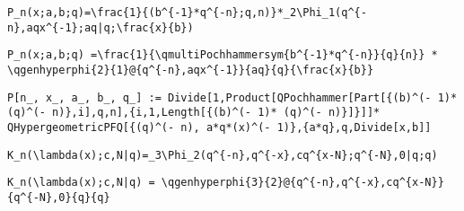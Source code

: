 \newsavebox\DEMA
\begin{lrbox}{\DEMA}
 \begin{minipage}[t]{0.82\textwidth}
  \lstinline[language={[latex]TeX},mathescape,breaklines=true]""
 \end{minipage}
\end{lrbox}
\newsavebox\DFT
\begin{lrbox}{\DFT}
 \begin{minipage}[t]{0.82\textwidth}
  \lstinline[language={[latex]TeX},mathescape,breaklines=true]"P_n(x;a,b;q)=\frac{1}{(b^{-1}*q^{-n};q,n)}*_2\Phi_1(q^{-n},aqx^{-1};aq|q;\frac{x}{b})"
 \end{minipage}
\end{lrbox}
\newsavebox\DFST
\begin{lrbox}{\DFST}
 \begin{minipage}[t]{0.82\textwidth}
  \lstinline[language={[latex]TeX},mathescape,breaklines=true]"P_n(x;a,b;q) =\frac{1}{\qmultiPochhammersym{b^{-1}*q^{-n}}{q}{n}} * \qgenhyperphi{2}{1}@{q^{-n},aqx^{-1}}{aq}{q}{\frac{x}{b}}"
 \end{minipage}
\end{lrbox}
\newsavebox\DFMM
\begin{lrbox}{\DFMM}
 \begin{minipage}[t]{0.82\textwidth}
  \lstinline[language={[latex]TeX},mathescape,breaklines=true]"P[n_, x_, a_, b_, q_] := Divide[1,Product[QPochhammer[Part[{(b)^(- 1)* (q)^(- n)},i],q,n],{i,1,Length[{(b)^(- 1)* (q)^(- n)}]}]]* QHypergeometricPFQ[{(q)^(- n), a*q*(x)^(- 1)},{a*q},q,Divide[x,b]]"
 \end{minipage}
\end{lrbox}
\newsavebox\DFMA
\begin{lrbox}{\DFMA}
 \begin{minipage}[t]{0.82\textwidth}
  \lstinline[language={[latex]TeX},mathescape,breaklines=true]""
 \end{minipage}
\end{lrbox}
\newsavebox\DGT
\begin{lrbox}{\DGT}
 \begin{minipage}[t]{0.82\textwidth}
  \lstinline[language={[latex]TeX},mathescape,breaklines=true]"K_n(\lambda(x);c,N|q)=_3\Phi_2(q^{-n},q^{-x},cq^{x-N};q^{-N},0|q;q)"
 \end{minipage}
\end{lrbox}
\newsavebox\DGST
\begin{lrbox}{\DGST}
 \begin{minipage}[t]{0.82\textwidth}
  \lstinline[language={[latex]TeX},mathescape,breaklines=true]"K_n(\lambda(x);c,N|q) = \qgenhyperphi{3}{2}@{q^{-n},q^{-x},cq^{x-N}}{q^{-N},0}{q}{q}"
 \end{minipage}
\end{lrbox}
